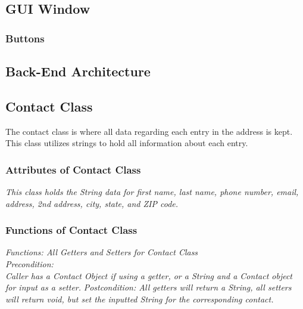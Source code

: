\documentclass[a4paper, 11pt]{article}
\begin{document}
\subsection{GUI Window}



\subsubsection{Buttons}





\subsection{Back-End Architecture}
\subsection{Contact Class}
The contact class is where all data regarding each entry in the address is kept. This class utilizes strings to hold all information about each entry. 
\subsubsection{Attributes of Contact Class}

\textit{This class holds the String data for first name, last name, phone number, email, address, 2nd address, city, state, and ZIP code.}
\subsubsection{Functions of Contact Class}
\textit{Functions: All Getters and Setters for Contact Class}\\
\textit{Precondition: \\Caller has a Contact Object if using a getter, or a String and a Contact object for input as a setter.}
\textit{Postcondition: All getters will return a String, all setters will return void, but set the inputted String for the corresponding contact.}








\end{document}
